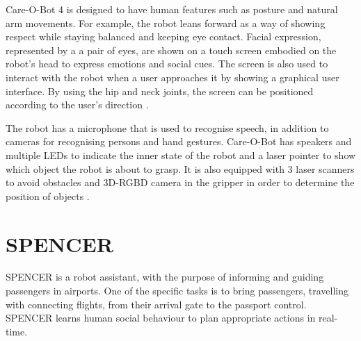 Care-O-Bot 4 is designed to have human features such as posture and natural arm movements. For example, the robot leans forward as a way of showing respect while staying balanced and keeping eye contact. Facial expression, represented by a a pair of eyes, are shown on a touch screen embodied on the robot’s head to express emotions and social cues. The screen is also used to interact with the robot when a user approaches it by showing a graphical user interface. By using the hip and neck joints, the screen can be positioned according to the user's direction \cite{cob4}.

The robot has a microphone that is used to recognise speech, in addition to cameras for recognising persons and hand gestures. Care-O-Bot has speakers and multiple LEDs to indicate the inner state of the robot and a laser pointer to show which object the robot is about to grasp. It is also equipped with 3 laser scanners to avoid obstacles and 3D-RGBD camera in the gripper in order to determine the position of objects \cite{cob4}.


\section{SPENCER}\label{sec:spencer}
SPENCER is a robot assistant, with the purpose of informing and guiding passengers in airports. One of the specific tasks is to bring passengers, travelling with connecting flights, from their arrival gate to the passport control. SPENCER learns human social behaviour to plan appropriate actions in real-time\cite{SPENCER_paper}.


